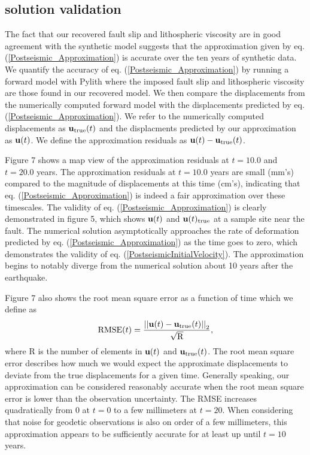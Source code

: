 \documentclass[fleqn,12pt]{article}
\begin{document}
\subsection{solution validation}
The fact that our recovered fault slip and lithospheric viscosity are
in good agreement with the synthetic model suggests that the
approximation given by eq. (\ref{Postseismic_Approximation}) is
accurate over the ten years of synthetic data.  We quantify the
accuracy of eq. (\ref{Postseismic_Approximation}) by running a forward
model with Pylith where the imposed fault slip and lithospheric
viscosity are those found in our recovered model.  We then compare the
displacements from the numerically computed forward model with the
displacements predicted by eq. (\ref{Postseismic_Approximation}).  We
refer to the numerically computed displacements as
$\bold{u}_{\mathrm{true}}(t)$ and the displacments predicted by our
approximation as $\bold{u}(t)$.  We define the approximation residuals
as $\bold{u}(t) - \bold{u}_{\mathrm{true}}(t)$.

Figure 7 shows a map view of the approximation residuals at $t=10.0$
and $t=20.0$ years.  The approximation residuals at $t=10.0$ years are
small (mm's) compared to the magnitude of displacements at this time
(cm's), indicating that eq. (\ref{Postseismic_Approximation}) is
indeed a fair approximation over these timescales.  The validity of
eq. (\ref{Postseismic_Approximation}) is clearly demonstrated in
figure 5, which shows $\bold{u}(t)$ and $\bold{u}(t)_{\mathrm{true}}$
at a sample site near the fault.  The numerical solution
asymptotically approaches the rate of deformation predicted by
eq. (\ref{Postseismic_Approximation}) as the time goes to zero, which
demonstrates the validity of eq. (\ref{PostseismicInitialVelocity}).
The approximation begins to notably diverge from the numerical
solution about 10 years after the earthquake.

Figure 7 also shows the root mean square error as
a function of time which we define as
\begin{equation}
  \mathrm{RMSE}(t) = \frac{\left|\left|\bold{u}(t) -
    \bold{u}_{\mathrm{true}}(t)\right|\right|_2}{\sqrt{\mathrm{R}}},
\end{equation}
where R is the number of elements in $\bold{u}(t)$ and
$\bold{u}_{\mathrm{true}}(t)$.  The root mean square error describes
how much we would expect the approximate displacements to deviate from
the true displacements for a given time.  Generally speaking, our
approximation can be considered reasonably accurate when the root mean square error
is lower than the observation uncertainty.  The RMSE increases
quadratically from 0 at $t=0$ to a few millimeters at $t=20$.  When
considering that noise for geodetic observations is also on order of a
few millimeters, this approximation appears to be sufficiently
accurate for at least up until $t=10$ years.
\end{document}
